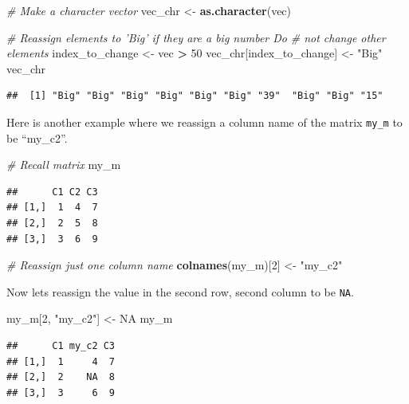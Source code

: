 \documentclass[
]{book}
\newenvironment{Shaded}{\begin{snugshade}}{\end{snugshade}}
\newcommand{\CommentTok}[1]{\textcolor[rgb]{0.56,0.35,0.01}{\textit{#1}}}
\newcommand{\DecValTok}[1]{\textcolor[rgb]{0.00,0.00,0.81}{#1}}
\newcommand{\KeywordTok}[1]{\textcolor[rgb]{0.13,0.29,0.53}{\textbf{#1}}}
\newcommand{\NormalTok}[1]{#1}
\newcommand{\OperatorTok}[1]{\textcolor[rgb]{0.81,0.36,0.00}{\textbf{#1}}}
\newcommand{\OtherTok}[1]{\textcolor[rgb]{0.56,0.35,0.01}{#1}}
\newcommand{\StringTok}[1]{\textcolor[rgb]{0.31,0.60,0.02}{#1}}
\begin{document}
\begin{Shaded}
\begin{Highlighting}[]
\CommentTok{# Make a character vector}
\NormalTok{vec_chr <-}\StringTok{ }\KeywordTok{as.character}\NormalTok{(vec)}

\CommentTok{# Reassign elements to 'Big' if they are a big number Do}
\CommentTok{# not change other elements}
\NormalTok{index_to_change <-}\StringTok{ }\NormalTok{vec }\OperatorTok{>}\StringTok{ }\DecValTok{50}
\NormalTok{vec_chr[index_to_change] <-}\StringTok{ "Big"}
\NormalTok{vec_chr}
\end{Highlighting}
\end{Shaded}

\begin{verbatim}
##  [1] "Big" "Big" "Big" "Big" "Big" "Big" "39"  "Big" "Big" "15"
\end{verbatim}

Here is another example where we reassign a column name of the matrix \texttt{my\_m} to be ``my\_c2''.

\begin{Shaded}
\begin{Highlighting}[]
\CommentTok{# Recall matrix}
\NormalTok{my_m}
\end{Highlighting}
\end{Shaded}

\begin{verbatim}
##      C1 C2 C3
## [1,]  1  4  7
## [2,]  2  5  8
## [3,]  3  6  9
\end{verbatim}

\begin{Shaded}
\begin{Highlighting}[]
\CommentTok{# Reassign just one column name}
\KeywordTok{colnames}\NormalTok{(my_m)[}\DecValTok{2}\NormalTok{] <-}\StringTok{ "my_c2"}
\end{Highlighting}
\end{Shaded}

Now lets reassign the value in the second row, second column to be \texttt{NA}.

\begin{Shaded}
\begin{Highlighting}[]
\NormalTok{my_m[}\DecValTok{2}\NormalTok{, }\StringTok{"my_c2"}\NormalTok{] <-}\StringTok{ }\OtherTok{NA}
\NormalTok{my_m}
\end{Highlighting}
\end{Shaded}

\begin{verbatim}
##      C1 my_c2 C3
## [1,]  1     4  7
## [2,]  2    NA  8
## [3,]  3     6  9
\end{verbatim}
\end{document}

